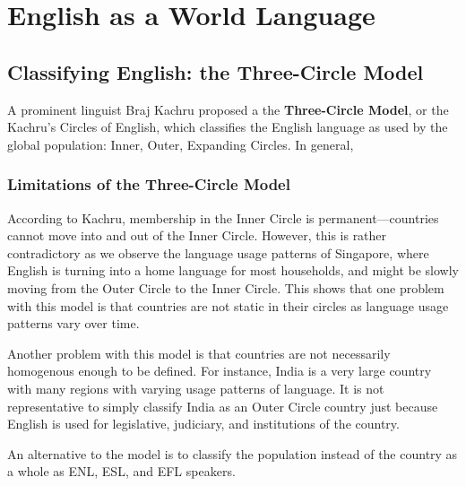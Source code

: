 \documentclass[../main.tex]{subfiles}
\begin{document}
    \section{English as a World Language}
    
    \subsection{Classifying English: the Three-Circle Model}
        A prominent linguist Braj Kachru proposed a the \textbf{Three-Circle Model}, or the Kachru's Circles of English, which classifies the English language as used by the global population: Inner, Outer, Expanding Circles. In general, 


        \subsubsection{Limitations of the Three-Circle Model}
            According to Kachru, membership in the Inner Circle is permanent---countries cannot move into and out of the Inner Circle. However, this is rather contradictory as we observe the language usage patterns of Singapore, where English is turning into a home language for most households, and might be slowly moving from the Outer Circle to the Inner Circle. This shows that one problem with this model is that countries are not static in their circles as language usage patterns vary over time. \par
            Another problem with this model is that countries are not necessarily homogenous enough to be defined. For instance, India is a very large country with many regions with varying usage patterns of language. It is not representative to simply classify India as an Outer Circle country just because English is used for legislative, judiciary, and institutions of the country. \par
            An alternative to the model is to classify the population instead of the country as a whole as ENL, ESL, and EFL speakers. 
\end{document}
